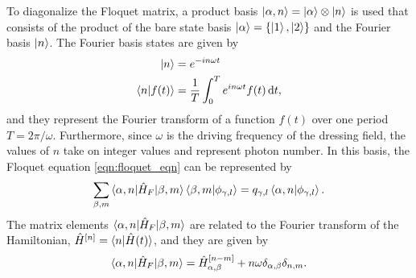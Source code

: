 To diagonalize the Floquet matrix, a product basis $\ket{\alpha,n}=\ket{\alpha}\otimes\ket{n}$ is used that consists of the product of the bare state basis $\ket{\alpha}=\{\ket{1},\ket{2}\}$ and the Fourier basis $\ket{n}$.  The Fourier basis states are given by
\begin{equation}
	\begin{aligned}
	\ket{n}&=e^{-in\omega t }\\
	\braket{n|f(t)} &= \frac{1}{T}\int_{0}^{T}e^{in\omega t}f(t)\mathop{}\!\mathrm{d} t,
	\end{aligned}
\end{equation}
and they represent the Fourier transform of a function $f(t)$ over one period $T=2\pi/\omega$.  Furthermore, since $\omega$ is the driving frequency of the dressing field, the values of $n$ take on integer values and represent photon number.  In this basis, the Floquet equation \ref{eqn:floquet_eqn} can be represented by
\begin{equation}
	\sum_{\beta,m}\braket{\alpha,n|\hat{H}_F|\beta,m}\braket{\beta,m|\phi_{\gamma,l}} = q_{\gamma,l}\braket{\alpha,n|\phi_{\gamma,l}}.
\end{equation}
The matrix elements $\braket{\alpha,n|\hat{H}_F|\beta,m}$ are related to the Fourier transform of the Hamiltonian, $\hat{H}^{[n]}=\braket{n|\hat{H}(t)}$, and they are given by
\begin{equation}
	\label{eqn:Floquet_hamiltonian_matric_elem}
	\braket{\alpha,n|\hat{H}_F|\beta,m} = \hat{H}_{\alpha,\beta}^{[n-m]} + n\omega\delta_{\alpha,\beta}\delta_{n,m}.
\end{equation}

